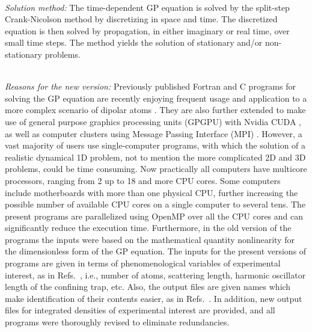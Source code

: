 \documentclass[onecolumn,3p]{elsarticle}
\begin{document}
\begin{small}
\noindent\\
{\em Solution method:}
The time-dependent GP equation is solved by the split-step Crank-Nicolson method by discretizing in space and time.
The discretized equation is then solved by propagation, in either imaginary or real time, over small time steps.
The method yields the solution of stationary and/or non-stationary problems.

\noindent\\
{\em Reasons for the new version:}
Previously published Fortran and C programs \cite{bec2009,bec2012} for solving the GP equation 
are recently enjoying frequent usage \cite{uca} and application to a more complex scenario of dipolar atoms \cite{dbec2015}.
They are also further extended to make use of general purpose graphics processing units (GPGPU) with Nvidia CUDA \cite{dbec2016},
as well as computer clusters using Message Passing Interface (MPI) \cite{bec2016}.
However, a vast majority of users use single-computer programs, with which the solution of a realistic dynamical 1D problem,
not to mention the more complicated 2D and 3D problems, could be time consuming. 
Now practically all computers have multicore processors, ranging from 2 up to 18 and more CPU cores.
Some computers include motherboards with more than one physical CPU, further increasing the possible number of available CPU cores on a single computer to several tens.
The present programs are parallelized using OpenMP over all the CPU cores and can significantly reduce the execution time.
Furthermore, in the old version of the programs \cite{bec2009,bec2012} the inputs were based on the mathematical quantity nonlinearity for the dimensionless form of the GP equation.
The inputs for the present versions of programs are given in terms of phenomenological variables of experimental interest,
as in Refs.~\cite{dbec2015,dbec2016}, i.e., number of atoms, scattering length, harmonic oscillator length of the confining trap, etc.
Also, the output files are given names which make identification of their contents easier, as in Refs.~\cite{dbec2015,dbec2016}.
In addition, new output files for integrated densities of experimental interest are provided, and all programs were 
thoroughly revised to eliminate redundancies.


\end{small}
\end{document}
